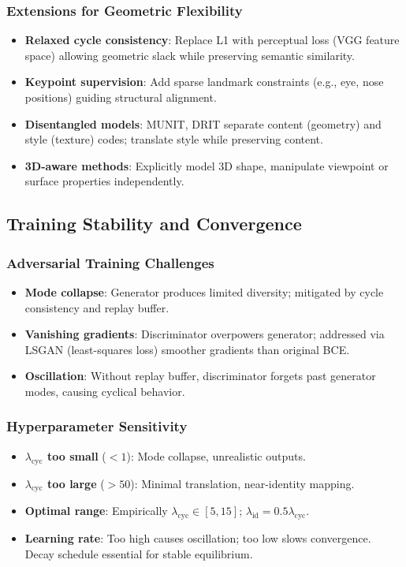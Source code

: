 \documentclass[conference]{IEEEtran}
\begin{document}
\subsubsection{Extensions for Geometric Flexibility}
\begin{itemize}
\item \textbf{Relaxed cycle consistency}: Replace L1 with perceptual loss (VGG feature space) allowing geometric slack while preserving semantic similarity.
\item \textbf{Keypoint supervision}: Add sparse landmark constraints (e.g., eye, nose positions) guiding structural alignment.
\item \textbf{Disentangled models}: MUNIT, DRIT separate content (geometry) and style (texture) codes; translate style while preserving content.
\item \textbf{3D-aware methods}: Explicitly model 3D shape, manipulate viewpoint or surface properties independently.
\end{itemize}

\subsection{Training Stability and Convergence}
\subsubsection{Adversarial Training Challenges}
\begin{itemize}
\item \textbf{Mode collapse}: Generator produces limited diversity; mitigated by cycle consistency and replay buffer.
\item \textbf{Vanishing gradients}: Discriminator overpowers generator; addressed via LSGAN (least-squares loss) smoother gradients than original BCE.
\item \textbf{Oscillation}: Without replay buffer, discriminator forgets past generator modes, causing cyclical behavior.
\end{itemize}

\subsubsection{Hyperparameter Sensitivity}
\begin{itemize}
\item \textbf{$\lambda_{\text{cyc}}$ too small} ($<1$): Mode collapse, unrealistic outputs.
\item \textbf{$\lambda_{\text{cyc}}$ too large} ($>50$): Minimal translation, near-identity mapping.
\item \textbf{Optimal range}: Empirically $\lambda_{\text{cyc}} \in [5, 15]$; $\lambda_{\text{id}} = 0.5 \lambda_{\text{cyc}}$.
\item \textbf{Learning rate}: Too high causes oscillation; too low slows convergence. Decay schedule essential for stable equilibrium.
\end{itemize}
\end{document}

